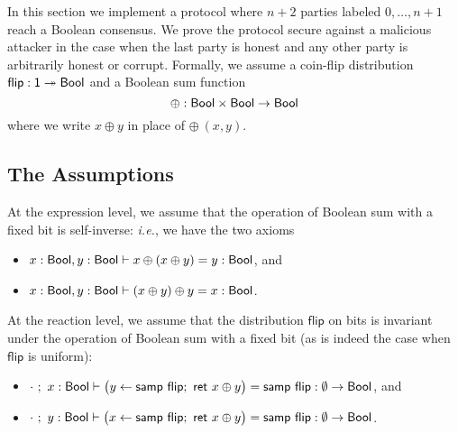\renewcommand{\flip}{\mathsf{flip}}
\renewcommand{\id}{\mathsf{id}}
\renewcommand{\adv}{\mathsf{adv}}
\newcommand{\party}{\mathsf{party}}
\newcommand{\comm}{\mathsf{comm}}
\renewcommand{\Flip}{\mathsf{Flip}}
\newcommand{\Commit}{\mathsf{Commit}}
\newcommand{\Committed}{\mathsf{Committed}}
\newcommand{\Open}{\mathsf{Open}}
\newcommand{\Opened}{\mathsf{Opened}}
\newcommand{\SumCommit}{\mathsf{SumCommit}}
\newcommand{\AllCommitted}{\mathsf{AllCommitted}}
\newcommand{\AllOpen}{\mathsf{AllOpen}}
\newcommand{\SumOpened}{\mathsf{SumOpened}}
\renewcommand{\Out}{\mathsf{Out}}
\newcommand{\LastCommit}{\mathsf{LastCommit}}
\renewcommand{\LeakFlip}{\mathsf{LeakFlip}}
\newcommand{\Ok}{\mathsf{Ok}}
\newcommand{\AdvCommit}{\mathsf{AdvCommit}}
\newcommand{\LeakCommitted}{\mathsf{LeakCommitted}}
\newcommand{\AdvOpen}{\mathsf{AdvOpen}}
\newcommand{\LeakOpened}{\mathsf{LeakOpened}}

In this section we implement a protocol where $n+2$ parties labeled $0,\ldots,n+1$ reach a Boolean consensus. We prove the protocol secure against a malicious attacker in the case when the last party is honest and any other party is arbitrarily honest or corrupt. Formally, we assume a coin-flip distribution $\flip : \one \twoheadrightarrow \Bool$ and a Boolean sum function \[\oplus : \mathsf{Bool} \times \mathsf{Bool} \rightarrow \mathsf{Bool}\] where we write $x \oplus y$ in place of $\oplus \ (x,y)$.

\subsection{The Assumptions}
At the expression level, we assume that the operation of Boolean sum with a fixed bit is self-inverse: \emph{i.e.}, we have the two axioms
\begin{itemize}
\item $x : \mathsf{Bool}, y : \mathsf{Bool} \vdash x \oplus (x \oplus y) = y : \mathsf{Bool}$, and  
\item $x : \mathsf{Bool}, y : \mathsf{Bool} \vdash (x \oplus y) \oplus y = x : \mathsf{Bool}$.
\end{itemize}
At the reaction level, we assume that the distribution $\flip$ on bits is invariant under the operation of Boolean sum with a fixed bit (as is indeed the case when $\flip$ is uniform):
\begin{itemize}
\item $\cdot \ ; \ x : \Bool \vdash \big(y \leftarrow \samp{\flip}; \ \ret{x \oplus y}\big) = \samp{\flip} : \emptyset \to \Bool$, and
\item $\cdot \ ; \ y : \Bool \vdash \big(x \leftarrow \samp{\flip}; \ \ret{x \oplus y}\big) = \samp{\flip} : \emptyset \to \Bool$.
\end{itemize}

